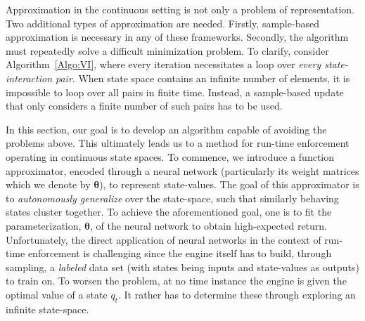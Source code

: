 Approximation in the continuous setting is not only a problem of representation. Two additional types of approximation are needed. Firstly, sample-based approximation is necessary in any of these frameworks. Secondly, the algorithm must repeatedly solve a difficult minimization problem. To clarify, consider Algorithm~\ref{Algo:VI}, where every iteration necessitates a loop over \emph{every state-interaction pair}. When state space contains an infinite number of elements, it is impossible to loop over all pairs in finite time. Instead, a sample-based update that only considers a finite number of such pairs has to be used. 

In this section, our goal is to develop an algorithm capable of avoiding the problems above. This ultimately leads us to a method for run-time enforcement operating in continuous state spaces. 
To commence, we introduce a function approximator, encoded through a neural network (particularly its weight matrices which we denote by $\bm{\theta}$), to represent state-values. The goal of this approximator is to \emph{autonomously generalize} over the state-space, such that similarly behaving states cluster together. To achieve the aforementioned goal, one is to fit the parameterization, $\bm{\theta}$, of the neural network to obtain high-expected return.  Unfortunately, the direct application of neural networks in the context of run-time enforcement is challenging since the engine itself has to build, through sampling, a \emph{labeled} data set (with states being inputs and state-values as outputs) to train on. To worsen the problem, at no time instance the engine is given the optimal value of a state $q_{t}$. It rather has to determine these through exploring an infinite state-space. 


